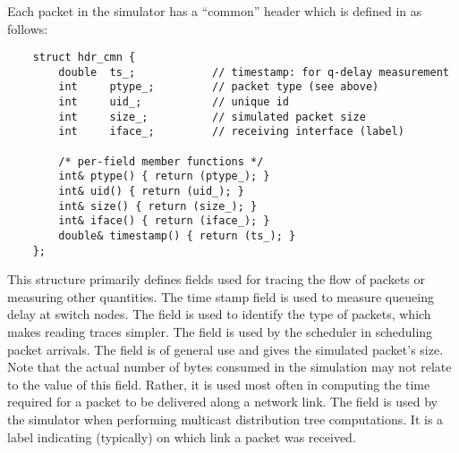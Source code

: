 \subsubsection{}

Each packet in the simulator has a ``common''
header which is defined in  as follows:
\begin{small}
\begin{verbatim}
	struct hdr_cmn {
		double  ts_;            // timestamp: for q-delay measurement
		int     ptype_;         // packet type (see above)
		int     uid_;           // unique id 
		int     size_;          // simulated packet size
		int     iface_;         // receiving interface (label)
	 
		/* per-field member functions */
		int& ptype() { return (ptype_); }
		int& uid() { return (uid_); }
		int& size() { return (size_); }
		int& iface() { return (iface_); }
		double& timestamp() { return (ts_); }
	}; 
\end{verbatim}
\end{small}
This structure primarily defines fields used for tracing
the flow of packets or measuring other quantities.
The time stamp field is used to measure queueing delay
at switch nodes.
The  field is used to identify the
type of packets, which makes reading traces simpler.
The  field is used by the scheduler in scheduling
packet arrivals.
The  field is of general use and gives the
simulated packet's size.
Note that the actual number of bytes consumed in the simulation
may not relate to the value of this field.
Rather, it is used most often in computing the time required for a packet
to be delivered along a network link.
The  field is used by the simulator when performing
multicast distribution tree computations.
It is a label indicating (typically) on which link a packet was received.

\subsubsection{}

